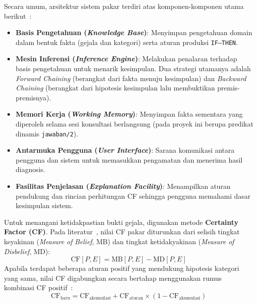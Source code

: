\documentclass[12pt,a4paper]{report}
\begin{document}
Secara umum, arsitektur sistem pakar terdiri atas komponen-komponen utama berikut~\cite{ahsyar2021}:
\begin{itemize}
  \item \textbf{Basis Pengetahuan (\textit{Knowledge Base})}: Menyimpan pengetahuan domain dalam bentuk fakta (gejala dan kategori) serta aturan produksi \texttt{IF--THEN}.
  \item \textbf{Mesin Inferensi (\textit{Inference Engine})}: Melakukan penalaran terhadap basis pengetahuan untuk menarik kesimpulan. Dua strategi utamanya adalah \textit{Forward Chaining} (berangkat dari fakta menuju kesimpulan) dan \textit{Backward Chaining} (berangkat dari hipotesis kesimpulan lalu membuktikan premis-premisnya).
  \item \textbf{Memori Kerja (\textit{Working Memory})}: Menyimpan fakta sementara yang diperoleh selama sesi konsultasi berlangsung (pada proyek ini berupa predikat dinamis \texttt{jawaban/2}).
  \item \textbf{Antarmuka Pengguna (\textit{User Interface})}: Sarana komunikasi antara pengguna dan sistem untuk memasukkan pengamatan dan menerima hasil diagnosis.
  \item \textbf{Fasilitas Penjelasan (\textit{Explanation Facility})}: Menampilkan aturan pendukung dan rincian perhitungan CF sehingga pengguna memahami dasar kesimpulan sistem.
\end{itemize}

Untuk menangani ketidakpastian bukti gejala, digunakan metode \textbf{Certainty Factor (CF)}. Pada literatur~\cite{azzahra2026}, nilai CF pakar diturunkan dari selisih tingkat keyakinan (\textit{Measure of Belief}, $\text{MB}$) dan tingkat ketidakyakinan (\textit{Measure of Disbelief}, $\text{MD}$):
\begin{equation}
  \text{CF}[P, E] = \text{MB}[P, E] - \text{MD}[P, E]
\end{equation}
Apabila terdapat beberapa aturan positif yang mendukung hipotesis kategori yang sama, nilai CF digabungkan secara bertahap menggunakan rumus kombinasi CF positif~\cite{azzahra2026,ahsyar2021}:
\begin{equation}
  \text{CF}_{\text{baru}} = \text{CF}_{\text{akumulasi}} + \text{CF}_{\text{aturan}} \times \left(1 - \text{CF}_{\text{akumulasi}}\right)
  \label{eq:cf_combine}
\end{equation}
\end{document}
